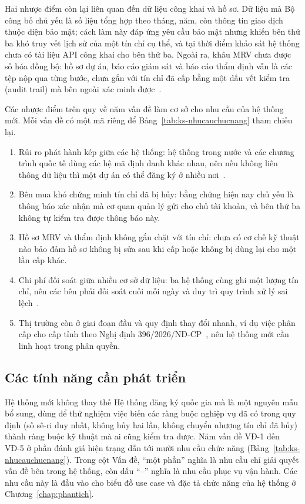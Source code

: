 Hai nhược điểm còn lại liên quan đến dữ liệu công khai và hồ sơ. Dữ liệu mà Bộ công bố chủ yếu là số liệu tổng hợp theo tháng, năm, còn thông tin giao dịch thuộc diện bảo mật; cách làm này đáp ứng yêu cầu bảo mật nhưng khiến bên thứ ba khó truy vết lịch sử của một tín chỉ cụ thể, và tại thời điểm khảo sát hệ thống chưa có tài liệu API công khai cho bên thứ ba. Ngoài ra, khâu MRV chưa được số hóa đồng bộ: hồ sơ dự án, báo cáo giám sát và báo cáo thẩm định vẫn là các tệp nộp qua từng bước, chưa gắn với tín chỉ đã cấp bằng một dấu vết kiểm tra (audit trail) mà bên ngoài xác minh được~\cite{mae2026tthc1014133}.

Các nhược điểm trên quy về năm vấn đề làm cơ sở cho nhu cầu của hệ thống mới. Mỗi vấn đề có một mã riêng để Bảng~\ref{tab:ks-nhucauchucnang} tham chiếu lại.
\begin{enumerate}[label=VĐ-\arabic*., leftmargin=1.6cm]
    \item Rủi ro phát hành kép giữa các hệ thống: hệ thống trong nước và các chương trình quốc tế dùng các hệ mã định danh khác nhau, nên nếu không liên thông dữ liệu thì một dự án có thể đăng ký ở nhiều nơi~\cite{schneider2019double}.
    \item Bên mua khó chứng minh tín chỉ đã bị hủy: bằng chứng hiện nay chủ yếu là thông báo xác nhận mà cơ quan quản lý gửi cho chủ tài khoản, và bên thứ ba không tự kiểm tra được thông báo này.
    \item Hồ sơ MRV và thẩm định không gắn chặt với tín chỉ: chưa có cơ chế kỹ thuật nào bảo đảm hồ sơ không bị sửa sau khi cấp hoặc không bị dùng lại cho một lần cấp khác.
    \item Chi phí đối soát giữa nhiều cơ sở dữ liệu: ba hệ thống cùng ghi một lượng tín chỉ, nên các bên phải đối soát cuối mỗi ngày và duy trì quy trình xử lý sai lệch~\cite{vietnam2026thongtu11}.
    \item Thị trường còn ở giai đoạn đầu và quy định thay đổi nhanh, ví dụ việc phân cấp cho cấp tỉnh theo Nghị định 396/2026/NĐ-CP~\cite{vietnam2026nghidinh396}, nên hệ thống mới cần linh hoạt trong phân quyền.
\end{enumerate}

\FloatBarrier
\subsection*{Các tính năng cần phát triển}
\label{subsec:ks-nhucau}

Hệ thống mới không thay thế Hệ thống đăng ký quốc gia mà là một nguyên mẫu bổ sung, dùng để thử nghiệm việc biến các ràng buộc nghiệp vụ đã có trong quy định (số sê-ri duy nhất, không hủy hai lần, không chuyển nhượng tín chỉ đã hủy) thành ràng buộc kỹ thuật mà ai cũng kiểm tra được. Năm vấn đề VĐ-1 đến VĐ-5 ở phần đánh giá hiện trạng dẫn tới mười nhu cầu chức năng (Bảng~\ref{tab:ks-nhucauchucnang}). Trong cột Vấn đề, ``một phần'' nghĩa là nhu cầu chỉ giải quyết vấn đề bên trong hệ thống, còn dấu ``--'' nghĩa là nhu cầu phục vụ vận hành. Các nhu cầu này là đầu vào cho biểu đồ use case và đặc tả chức năng của hệ thống ở Chương~\ref{chap:phantich}.

